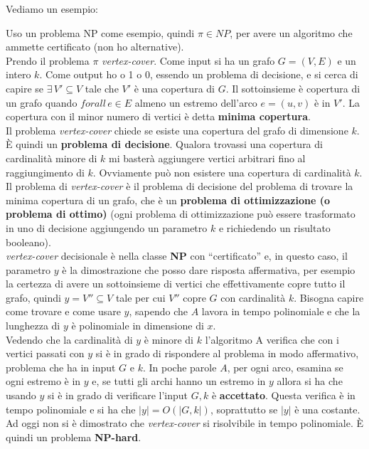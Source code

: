\documentclass[a4paper,12pt, oneside]{book}
\begin{document}
Vediamo un esempio:
\begin{esempio}
  Uso un problema NP come esempio, quindi $\pi\in NP$, per avere un algoritmo
  che ammette certificato (non ho alternative). \\
  Prendo il problema $\pi$ \emph{vertex-cover}. Come input si ha un grafo
  $G=(V,E)$ e un intero $k$. Come output ho o 1 o 0, essendo un problema di
  decisione, e si cerca di capire se $\exists\, V'\subseteq V$ tale che $V'$ è
  una copertura di $G$. Il sottoinsieme è copertura di un grafo quando $forall\,
  e\in E$ almeno un estremo dell'arco $e=(u,v)$ è in $V'$. La copertura con il
  minor numero di vertici è detta \textbf{minima copertura}.\\
  Il problema \emph{vertex-cover} chiede se esiste una copertura del grafo di
  dimensione $k$. È quindi un \textbf{problema di decisione}. Qualora trovassi
  una copertura di cardinalità minore di $k$ mi basterà aggiungere vertici
  arbitrari fino al raggiungimento di $k$. Ovviamente può non esistere una
  copertura di cardinalità $k$.\\
  Il problema di \emph{vertex-cover} è il problema di decisione del problema di
  trovare la minima copertura di un grafo, che è un \textbf{problema di
    ottimizzazione (o problema di ottimo)} (ogni problema di ottimizzazione può
  essere trasformato in uno di decisione aggiungendo un parametro $k$ e
  richiedendo un risultato booleano).\\
  \emph{vertex-cover} decisionale è nella classe \textbf{NP} con ``certificato''
  e, in questo caso, il parametro $y$ è la dimostrazione che posso dare risposta
  affermativa, per esempio la certezza di avere un sottoinsieme di vertici che
  effettivamente copre tutto il grafo, quindi $y=V''\subseteq V$ tale per cui
  $V''$ copre $G$ con cardinalità $k$. Bisogna capire come trovare e come usare
  $y$, sapendo che $A$ lavora in tempo polinomiale e che la lunghezza di $y$ è
  polinomiale in dimensione di $x$.\\ 
  Vedendo che la cardinalità di $y$ è minore di $k$ l'algoritmo A verifica che
  con i vertici passati con $y$ si è in grado di rispondere al problema in modo
  affermativo, problema che ha in input $G$ e $k$. In poche parole $A$, per ogni
  arco, esamina se ogni estremo è in $y$ e, se tutti gli archi hanno un estremo
  in $y$ allora si ha che usando $y$ si è in grado di verificare l'input $G,
  k$ è \textbf{accettato}. Questa verifica è in tempo polinomiale e si ha che
  $|y|=O(|G,k|)$, soprattutto se $|y|$ è una costante.\\
  Ad oggi non si è dimostrato che \emph{vertex-cover} si risolvibile in tempo
  polinomiale. È quindi un problema \textbf{NP-hard}.
\end{esempio}
\end{document}

